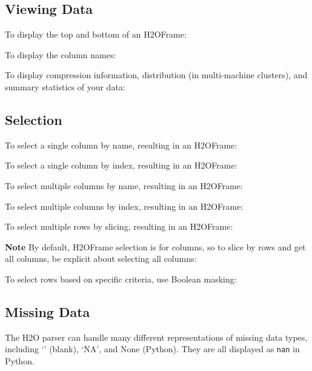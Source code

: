 {\subsection{Viewing Data}
To display the top and bottom of an H2OFrame:



To display the column names:


To display compression information, distribution (in multi-machine clusters), and summary statistics of your data:



\subsection{Selection}
To select a single column by name, resulting in an H2OFrame:


To select a single column by index, resulting in an H2OFrame:


To select multiple columns by name, resulting in an H2OFrame:


To select multiple columns by index, resulting in an H2OFrame:


To select multiple rows by slicing, resulting in an H2OFrame: 

\textbf{Note} By default, H2OFrame selection is for columns, so to slice by rows
and get all columns, be explicit about selecting all columns:


\newpage

To select rows based on specific criteria, use Boolean masking:



\subsection{Missing Data}
The H2O parser can handle many different representations of missing data types, including `' (blank),
`NA',  and None (Python).  They are all displayed as \texttt{nan} in Python.

}
